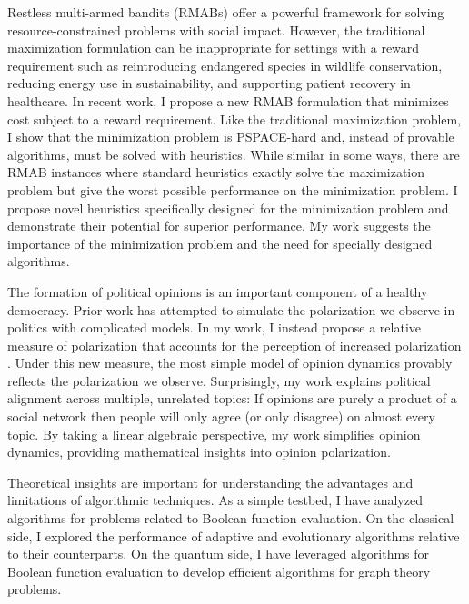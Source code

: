 \documentclass[11pt]{article}
\begin{document}
Restless multi-armed bandits (RMABs) offer a powerful framework for solving resource-constrained problems with social impact. However, the traditional maximization formulation can be inappropriate for settings with a reward requirement such as reintroducing endangered species in wildlife conservation, reducing energy use in sustainability, and supporting patient recovery in healthcare. In recent work, I propose a new RMAB formulation that minimizes cost subject to a reward requirement. Like the traditional maximization problem, I show that the minimization problem is PSPACE-hard and, instead of provable algorithms, must be solved with heuristics. While similar in some ways, there are RMAB instances where standard heuristics exactly solve the maximization problem but give the worst possible performance on the minimization problem. I propose novel heuristics specifically designed for the minimization problem and demonstrate their potential for superior performance. My work suggests the importance of the minimization problem and the need for specially designed algorithms.

The formation of political opinions is an important component of a healthy democracy. Prior work has attempted to simulate the polarization we observe in politics with complicated models. In my work, I instead propose a relative measure of polarization that accounts for the perception of increased polarization \cite{musco2022quantify}. Under this new measure, the most simple model of opinion dynamics provably reflects the polarization we observe. Surprisingly, my work explains political alignment across multiple, unrelated topics: If opinions are purely a product of a social network then people will only agree (or only disagree) on almost every topic. By taking a linear algebraic perspective, my work simplifies opinion dynamics, providing mathematical insights into opinion polarization.


Theoretical insights are important for understanding the advantages and limitations of algorithmic techniques. As a simple testbed, I have analyzed algorithms for problems related to Boolean function evaluation. On the classical side, I explored the performance of adaptive and evolutionary algorithms relative to their counterparts. On the quantum side, I have leveraged algorithms for Boolean function evaluation to develop efficient algorithms for graph theory problems.
\end{document}
